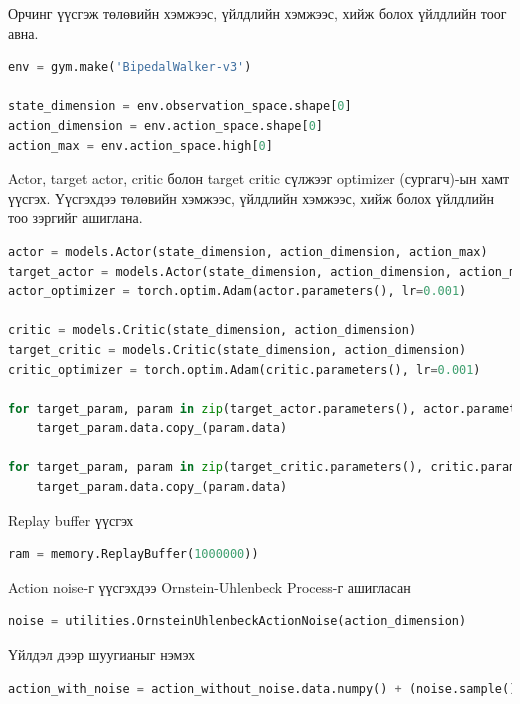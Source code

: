 \documentclass[12pt,A4]{report}
\begin{document}
Орчинг үүсгэж төлөвийн хэмжээс, үйлдлийн хэмжээс, хийж болох үйлдлийн тоог авна. 

\begin{lstlisting}[language=Python, caption=Орчин үүсгэх, frame=single]
env = gym.make('BipedalWalker-v3')

state_dimension = env.observation_space.shape[0]
action_dimension = env.action_space.shape[0]
action_max = env.action_space.high[0]
\end{lstlisting}

Actor, target actor, critic болон target critic сүлжээг optimizer (сургагч)-ын хамт үүсгэх. Үүсгэхдээ төлөвийн хэмжээс, үйлдлийн хэмжээс, хийж болох үйлдлийн тоо зэргийг ашиглана.

\begin{lstlisting}[language=Python, caption=Actor critic сүлжээ үүсгэх, frame=single]
actor = models.Actor(state_dimension, action_dimension, action_max)
target_actor = models.Actor(state_dimension, action_dimension, action_max)
actor_optimizer = torch.optim.Adam(actor.parameters(), lr=0.001)

critic = models.Critic(state_dimension, action_dimension)
target_critic = models.Critic(state_dimension, action_dimension)
critic_optimizer = torch.optim.Adam(critic.parameters(), lr=0.001)

for target_param, param in zip(target_actor.parameters(), actor.parameters()):
	target_param.data.copy_(param.data)

for target_param, param in zip(target_critic.parameters(), critic.parameters()):
    target_param.data.copy_(param.data)
\end{lstlisting}

Replay buffer үүсгэх

\begin{lstlisting}[language=Python, caption=Replay buffer үүсгэх, frame=single]
ram = memory.ReplayBuffer(1000000))
\end{lstlisting}

Action noise-г үүсгэхдээ Ornstein-Uhlenbeck Process-г ашигласан

\begin{lstlisting}[language=Python, caption=Шуугиан үүсгэх, frame=single]
noise = utilities.OrnsteinUhlenbeckActionNoise(action_dimension)
\end{lstlisting}

Үйлдэл дээр шуугианыг нэмэх

\begin{lstlisting}[language=Python, caption=Үйлдэл дээр шуугиан нэмэх, frame=single]
action_with_noise = action_without_noise.data.numpy() + (noise.sample() * action_max)
\end{lstlisting}
\end{document}
